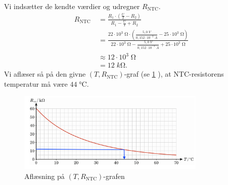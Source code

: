 \documentclass{report}
\begin{document}
Vi indsætter de kendte værdier og udregner $R _{\text{NTC} }$.
\begin{equation*}
\begin{split}
  R _{\text{NTC } }&=\frac{R_1 \cdot \left(\frac{U}{I}-R_2\right) }{R_1-\frac{U}{I}+R_2}\\
  &=\frac{22 \cdot 10^3\;\unit{\ohm} \cdot \left(\frac{5,0 \;\unit{V} }{0,152 \cdot 10 ^{-3}\;\unit{A} }-25 \cdot 10^3 \;\unit{\ohm} \right) }{22 \cdot 10^3 \;\unit{\ohm} - \frac{5,0 \;\unit{V} }{0,152 \cdot 10 ^{-3} \;\unit{A} }+25 \cdot 10^3 \;\unit{\ohm}}\\
  &\approx 12 \cdot 10^3 \;\unit{\ohm} \\
  &=12 \;\unit{k\ohm}.
\end{split}
\end{equation*}
Vi aflæser så på den givne $(T, R _{\text{NTC} })$-graf (se \cref{fig:TR} ), at NTC-resistorens temperatur må være $44 \;\unit{\celsius} $.
\begin{figure}[H]
\begin{center}
  \includegraphics[width=0.8\textwidth]{TR.png}
\end{center}
\caption{Aflæsning på $(T, R _{\text{NTC} })$-grafen}
\label{fig:TR}
\end{figure}
\end{document}
